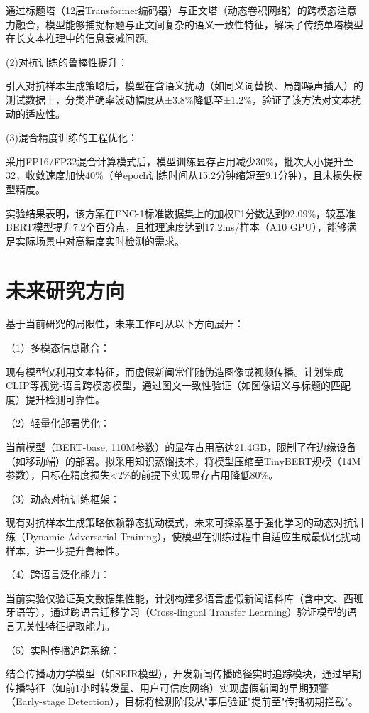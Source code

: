 \documentclass{cjc}
\begin{document}
通过标题塔（12层Transformer编码器）与正文塔（动态卷积网络）的跨模态注意力融合，模型能够捕捉标题与正文间复杂的语义一致性特征，解决了传统单塔模型在长文本推理中的信息衰减问题。

(2)对抗训练的鲁棒性提升：

引入对抗样本生成策略后，模型在含语义扰动（如同义词替换、局部噪声插入）的测试数据上，分类准确率波动幅度从±3.8\%降低至±1.2\%，验证了该方法对文本扰动的适应性。

(3)混合精度训练的工程优化：

采用FP16/FP32混合计算模式后，模型训练显存占用减少30\%，批次大小提升至32，收敛速度加快40\%（单epoch训练时间从15.2分钟缩短至9.1分钟），且未损失模型精度。

实验结果表明，该方案在FNC-1标准数据集上的加权F1分数达到92.09\%，较基准BERT模型提升7.2个百分点，且推理速度达到17.2ms/样本（A10 GPU），能够满足实际场景中对高精度实时检测的需求。

\section{未来研究方向}

基于当前研究的局限性，未来工作可从以下方向展开：

（1）多模态信息融合：

现有模型仅利用文本特征，而虚假新闻常伴随伪造图像或视频传播。计划集成CLIP等视觉-语言跨模态模型，通过图文一致性验证（如图像语义与标题的匹配度）提升检测可靠性。

（2）轻量化部署优化：

当前模型（BERT-base, 110M参数）的显存占用高达21.4GB，限制了在边缘设备（如移动端）的部署。拟采用知识蒸馏技术，将模型压缩至TinyBERT规模（14M参数），目标在精度损失<2\%的前提下实现显存占用降低80\%。

（3）动态对抗训练框架：

现有对抗样本生成策略依赖静态扰动模式，未来可探索基于强化学习的动态对抗训练（Dynamic Adversarial Training），使模型在训练过程中自适应生成最优化扰动样本，进一步提升鲁棒性。

（4）跨语言泛化能力：

当前实验仅验证英文数据集性能，计划构建多语言虚假新闻语料库（含中文、西班牙语等），通过跨语言迁移学习（Cross-lingual Transfer Learning）验证模型的语言无关性特征提取能力。

（5）实时传播追踪系统：

结合传播动力学模型（如SEIR模型），开发新闻传播路径实时追踪模块，通过早期传播特征（如前1小时转发量、用户可信度网络）实现虚假新闻的早期预警（Early-stage Detection），目标将检测阶段从"事后验证"提前至"传播初期拦截"。
\end{document}
